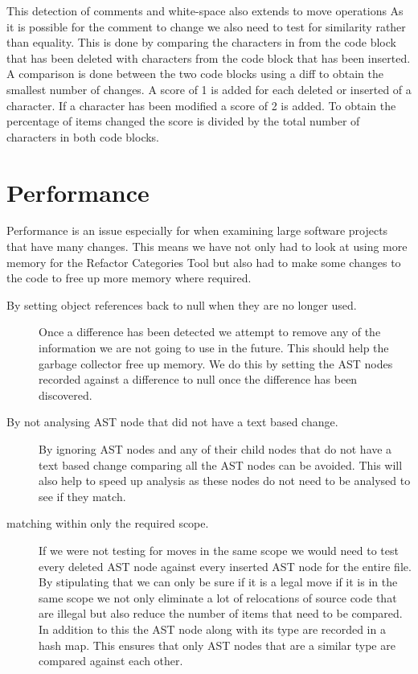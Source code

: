 This detection of comments and white-space also extends to move operations 
As it is possible for the comment to change we also need to test for similarity rather than equality.  
This is done by comparing the characters in from the code block that has been deleted with characters from the code block that has been inserted.  
A comparison is done between the two code blocks using a diff to obtain the smallest number of changes. 
A score of 1 is added for each deleted or inserted of a character.
If a character has been modified a score of 2 is added. 
To obtain the percentage of items changed the score is divided by the total number of characters in both code blocks.




\section{Performance}
Performance is an issue especially for when examining large software projects that have many changes. This means we have not only had to look at using more memory for the Refactor Categories Tool but also had to make some changes to the code to free up more memory where required.

\begin{description}
 \item [By setting object references back to null when they are no longer used.]
  Once a difference has been detected we attempt to remove any of the information we are not going to use in the future.  This should help the garbage collector free up memory. We do this by setting the AST nodes recorded against a difference to null once the difference has been discovered. 
\item [By not analysing AST node that did not have a text based change.] 
  By ignoring AST nodes and any of their child nodes that do not have a text based change comparing all the AST nodes can be avoided.  This will also help to speed up analysis as these nodes do not need to be analysed to see if they match.
\item [matching within only the required scope.]
  If we were not testing for moves in the same scope we would need to test every deleted AST node against every inserted AST node for the entire file. By stipulating that we can only be sure if it is a legal move if it is in the same scope we not only eliminate a lot of relocations of source code that are illegal but also reduce the number of items that need to be compared. In addition to this the AST node along with its type are recorded in a hash map.  This ensures that only AST nodes that are a similar type are compared against each other.
\end{description}


